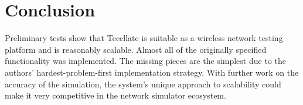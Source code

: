 \section{Conclusion}

Preliminary tests show that Tecellate is suitable as a wireless network testing platform and is reasonably scalable. Almost all of the originally specified functionality was implemented. The missing pieces are the simplest due to the authors' hardest-problem-first implementation strategy. With further work on the accuracy of the simulation, the system's unique approach to scalability could make it very competitive in the network simulator ecosystem.